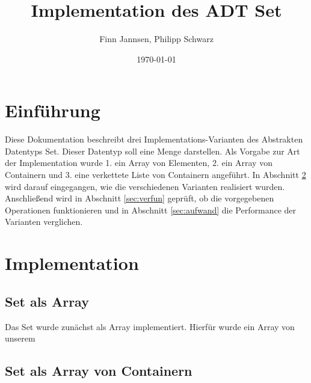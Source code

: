 \documentclass[11pt]{scrartcl}
\title{Implementation des ADT Set}
\author{Finn Jannsen, Philipp Schwarz}
\date{\today{}}
\begin{document}
\maketitle

\tableofcontents

\section{Einführung}
\label{sec:einfuehrung}

Diese Dokumentation beschreibt drei Implementations-Varianten des Abstrakten Datentyps Set. Dieser Datentyp soll eine Menge darstellen.
Als Vorgabe zur Art der Implementation wurde 1. ein Array von Elementen, 2. ein Array von Containern und 3. eine verkettete Liste von Containern angeführt.
In Abschnitt \ref{sec:implementation} wird darauf eingegangen, wie die verschiedenen Varianten realisiert wurden.
Anschließend wird in Abschnitt \ref{sec:verfun} geprüft, ob die vorgegebenen Operationen funktionieren und in Abschnitt \ref{sec:aufwand} die Performance der Varianten verglichen.

\section{Implementation}
\label{sec:implementation}
\subsection{Set als Array}
\label{sec:setArray}

Das Set wurde zunächst als Array implementiert. Hierfür wurde ein Array von unserem 

\subsection{Set als Array von Containern}
\label{sec:setConArray}
\end{document}
